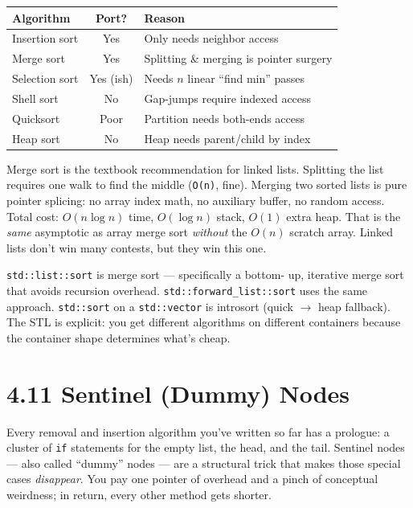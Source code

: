 \documentclass[11pt]{article}
\begin{document}
\begin{center}
\begin{tabular}{|l|c|l|}
\hline
\textbf{Algorithm} & \textbf{Port?} & \textbf{Reason} \\
\hline
Insertion sort & Yes      & Only needs neighbor access \\
Merge sort     & Yes      & Splitting \& merging is pointer surgery \\
Selection sort & Yes (ish) & Needs $n$ linear ``find min'' passes \\
Shell sort     & No       & Gap-jumps require indexed access \\
Quicksort      & Poor     & Partition needs both-ends access \\
Heap sort      & No       & Heap needs parent/child by index \\
\hline
\end{tabular}
\end{center}

\begin{ideabox}
Merge sort is the textbook recommendation for linked lists.
Splitting the list requires one walk to find the middle
(\texttt{O(n)}, fine). Merging two sorted lists is pure pointer
splicing: no array index math, no auxiliary buffer, no random
access. Total cost: $O(n \log n)$ time, $O(\log n)$ stack, $O(1)$
extra heap. That is the \emph{same} asymptotic as array merge
sort \emph{without} the $O(n)$ scratch array. Linked lists don't
win many contests, but they win this one.
\end{ideabox}

\begin{notebox}
\texttt{std::list::sort} is merge sort --- specifically a bottom-
up, iterative merge sort that avoids recursion overhead.
\texttt{std::forward\_list::sort} uses the same approach.
\texttt{std::sort} on a \texttt{std::vector} is introsort (quick
$\to$ heap fallback). The STL is explicit: you get different
algorithms on different containers because the container shape
determines what's cheap.
\end{notebox}

\section{4.11 Sentinel (Dummy) Nodes}

Every removal and insertion algorithm you've written so far has a
prologue: a cluster of \texttt{if} statements for the empty list,
the head, and the tail. Sentinel nodes --- also called ``dummy''
nodes --- are a structural trick that makes those special cases
\emph{disappear}. You pay one pointer of overhead and a pinch of
conceptual weirdness; in return, every other method gets shorter.
\end{document}
